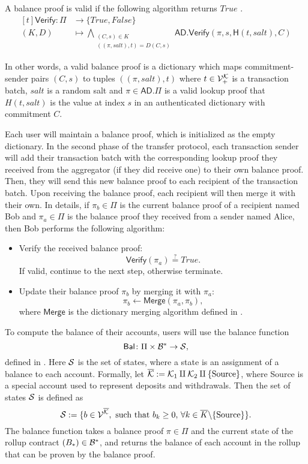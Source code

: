 A balance proof is valid if the following algorithm returns \(True\) \href{https://github.com/\repo FVIntmax/BalanceProof.lean#L60}{\ExternalLink}.
    \[
  \begin{aligned}[t]
    \mathsf{Verify} \colon \Pi &\to \{True,False\} \\
                  (K,D) &\mapsto \bigwedge_{\substack{(C,s) \in K \\ ((\pi,salt), t) = D(C,s)}} \mathsf{AD.Verify}(\pi,s,\mathsf{H}(t,salt),C)
  \end{aligned}\]

In other words, a valid balance proof is a dictionary which maps commitment-sender pairs \((C,s)\) to tuples \(((\pi,salt), t)\) where \(t \in \V_+^{\K}\) is a transaction batch, \(salt\) is a random salt and \(\pi \in \mathsf{AD}.\Pi\) is a valid lookup proof that \(H(t,salt)\) is the value at index \(s\) in an authenticated dictionary with commitment \(C\).

Each user will maintain a balance proof, which is initialized as the empty dictionary. In the second phase of the transfer protocol, each transaction sender will add their transaction batch with the corresponding lookup proof they received from the aggregator (if they did receive one) to their own balance proof. Then, they will send this new balance proof to each recipient of the transaction batch. Upon receiving the balance proof, each recipient will then merge it with their own. In details, if \(\pi_b \in \Pi\) is the current balance proof of a recipient named Bob and \(\pi_a \in \Pi\) is the balance proof they received from a sender named Alice, then Bob performs the following algorithm:

\begin{itemize}
  \item Verify the received balance proof: \[\mathsf{Verify}(\pi_a) \stackrel{?}{=} True.\] If valid, continue to the next step, otherwise terminate.
  \item Update their balance proof \(\pi_b\) by merging it with \(\pi_a\): \[\pi_b \leftarrow \mathsf{Merge}(\pi_a, \pi_b),\] where \(\mathsf{Merge}\) is the dictionary merging algorithm defined in .
\end{itemize}

To compute the balance of their accounts, users will use the balance function \[\mathsf{Bal} \colon \Pi \times \B^* \to \S,\] defined in . Here \(\S\) is the set of states, where a state is an assignment of a balance to each account. Formally, let \(\overline{\K} := \K_1 \amalg \K_2 \amalg \{\source\}\), where Source is a special account used to represent deposits and withdrawals. Then the set of states \(\S\) is defined \href{https://github.com/\repo FVIntmax/State.lean#L31}{\ExternalLink}as \[\S := \{b \in \V^{\overline{\K}}, \text{ such that } b_k \geq 0,\, \forall k \in \overline{K}\backslash \{\source\}\}.\] The balance function takes a balance proof \(\pi \in \Pi\) and the current state of the rollup contract \((B_*) \in \B^*\), and returns the balance of each account in the rollup that can be proven by the balance proof.

